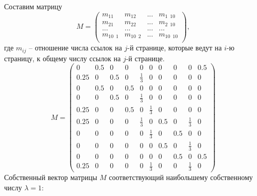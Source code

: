 \documentclass[a5paper, 10pt]{article}
\theoremstyle{definition}
\theoremstyle{plain}
\theoremstyle{remark}
\begin{document}
Составим матрицу 
\begin{equation*}
M=
\begin{pmatrix}
m_{11} & m_{12} & ... & m_{1\,\,\,10}\\
m_{21} & m_{22} & ... & m_{2\,\,\,10}\\
... & ... & ... & ...\\
m_{10\,\,\,1} & m_{10 \,\,\,2} & ... & m_{10\,\,\,10}\\
\end{pmatrix},
\end{equation*}
где $m_{ij}$ -- отношение числа ссылок на $j$-й странице, которые ведут на $i$-ю страницу, к общему числу ссылок на $j$-й странице.
\begin{equation*}
M=
\begin{pmatrix}
0 & 0.5 & 0 & 0 & 0 & 0 & 0 & 0 & 0 & 0.5\\
0.25 & 0 & 0.5 & 0 & \frac{1}{3} & 0 & 0 & 0 & 0 & 0\\
0 & 0.5 & 0 & 0.5 & 0 & 0 & 0 & 0 & 0 & 0\\
0 & 0 & 0.5 & 0 & \frac{1}{3} & 0 & 0 & 0 & 0 & 0\\
0.25 & 0 & 0 & 0.5 & 0 & \frac{1}{3} & 0 & 0 & 0 & 0\\
0.25 & 0 & 0 & 0 & \frac{1}{3} & 0 & 0.5 & 0 & \frac{1}{3} & 0\\
0 & 0 & 0 & 0 & 0 &\frac{1}{3} & 0 & 0.5 & 0 & 0\\
0 & 0 & 0 & 0 & 0 & 0 & 0.5 & 0 & \frac{1}{3} & 0\\
0 & 0 & 0 & 0 & 0 & 0 & 0 & 0.5 & 0 & 0.5\\
0.25 & 0 & 0 & 0 & 0 &  \frac{1}{3} & 0 & 0 & \frac{1}{3} & 0
\end{pmatrix}
\end{equation*}
Собственный вектор матрицы $M$ соответствующий наибольшему собственному числу  $\lambda = 1$:
\end{document}

